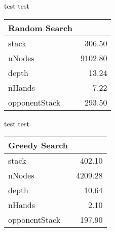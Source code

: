 \documentclass{article}
\begin{document}
    test test
        
    \begin{tabular}{lr}
        \toprule
        {Random Search} &        \\
        \midrule
        stack         &   306.50 \\
        nNodes        &  9102.80 \\
        depth         &    13.24 \\
        nHands        &     7.22 \\
        opponentStack &   293.50 \\
        \bottomrule
    \end{tabular}
        
    test test

    \begin{tabular}{lr}
        \toprule
        {Greedy Search} &        \\
        \midrule
        stack         &   402.10 \\
        nNodes        &  4209.28 \\
        depth         &    10.64 \\
        nHands        &     2.10 \\
        opponentStack &   197.90 \\
        \bottomrule
    \end{tabular}
\end{document}
